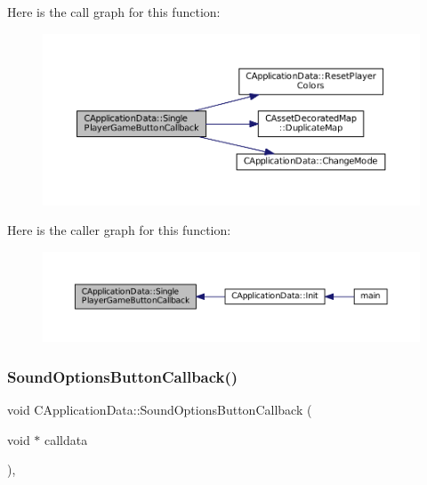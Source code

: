 Here is the call graph for this function\+:
\nopagebreak
\begin{figure}[H]
\begin{center}
\leavevmode
\includegraphics[width=350pt]{classCApplicationData_a239a28599cbb6762c21306a4a03c6202_cgraph}
\end{center}
\end{figure}
Here is the caller graph for this function\+:
\nopagebreak
\begin{figure}[H]
\begin{center}
\leavevmode
\includegraphics[width=350pt]{classCApplicationData_a239a28599cbb6762c21306a4a03c6202_icgraph}
\end{center}
\end{figure}
\hypertarget{classCApplicationData_a7169395ea835eaa9c98188d1b3583534}{}\label{classCApplicationData_a7169395ea835eaa9c98188d1b3583534} 
\subsubsection{\texorpdfstring{Sound\+Options\+Button\+Callback()}{SoundOptionsButtonCallback()}}
{\footnotesize\ttfamily void C\+Application\+Data\+::\+Sound\+Options\+Button\+Callback (\begin{DoxyParamCaption}\item[{void $\ast$}]{calldata }\end{DoxyParamCaption})\hspace{0.3cm}{\ttfamily [static]}, {\ttfamily [protected]}}



